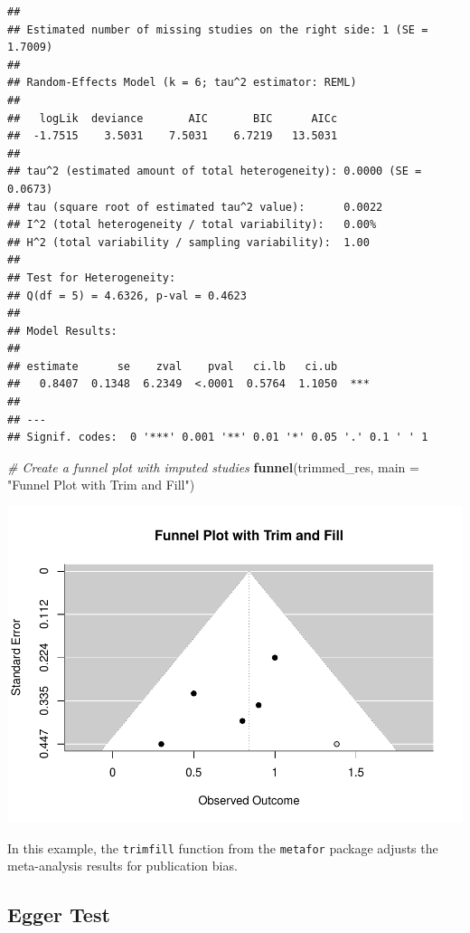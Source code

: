 \documentclass[
]{book}
\newenvironment{Shaded}{\begin{snugshade}}{\end{snugshade}}
\newcommand{\AttributeTok}[1]{\textcolor[rgb]{0.13,0.29,0.53}{#1}}
\newcommand{\CommentTok}[1]{\textcolor[rgb]{0.56,0.35,0.01}{\textit{#1}}}
\newcommand{\FunctionTok}[1]{\textcolor[rgb]{0.13,0.29,0.53}{\textbf{#1}}}
\newcommand{\NormalTok}[1]{#1}
\newcommand{\StringTok}[1]{\textcolor[rgb]{0.31,0.60,0.02}{#1}}
\begin{document}
\begin{verbatim}
## 
## Estimated number of missing studies on the right side: 1 (SE = 1.7009)
## 
## Random-Effects Model (k = 6; tau^2 estimator: REML)
## 
##   logLik  deviance       AIC       BIC      AICc   
##  -1.7515    3.5031    7.5031    6.7219   13.5031   
## 
## tau^2 (estimated amount of total heterogeneity): 0.0000 (SE = 0.0673)
## tau (square root of estimated tau^2 value):      0.0022
## I^2 (total heterogeneity / total variability):   0.00%
## H^2 (total variability / sampling variability):  1.00
## 
## Test for Heterogeneity:
## Q(df = 5) = 4.6326, p-val = 0.4623
## 
## Model Results:
## 
## estimate      se    zval    pval   ci.lb   ci.ub      
##   0.8407  0.1348  6.2349  <.0001  0.5764  1.1050  *** 
## 
## ---
## Signif. codes:  0 '***' 0.001 '**' 0.01 '*' 0.05 '.' 0.1 ' ' 1
\end{verbatim}

\begin{Shaded}
\begin{Highlighting}[]
\CommentTok{\# Create a funnel plot with imputed studies}
\FunctionTok{funnel}\NormalTok{(trimmed\_res, }\AttributeTok{main =} \StringTok{"Funnel Plot with Trim and Fill"}\NormalTok{)}
\end{Highlighting}
\end{Shaded}

\includegraphics{_main_files/figure-latex/unnamed-chunk-34-1.pdf}

In this example, the \texttt{trimfill} function from the \texttt{metafor} package adjusts the meta-analysis results for publication bias.

\subsection{Egger Test}\label{egger-test}
\end{document}
